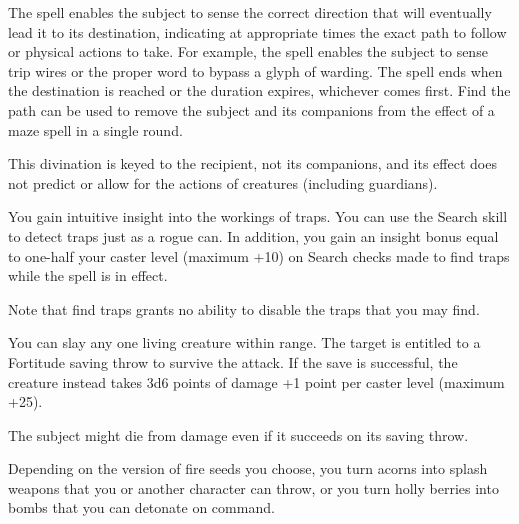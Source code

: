 \begin{multicols}{2}
\begin{small}
\smallskip\noindent The spell enables the subject to sense the correct direction that will eventually lead it to its destination, indicating at appropriate times the exact path to follow or physical actions to take. For example, the spell enables the subject to sense trip wires or the proper word to bypass a glyph of warding. The spell ends when the destination is reached or the duration expires, whichever comes first. Find the path can be used to remove the subject and its companions from the effect of a maze spell in a single round.

\smallskip\noindent This divination is keyed to the recipient, not its companions, and its effect does not predict or allow for the actions of creatures (including guardians).


\noindent You gain intuitive insight into the workings of traps. You can use the Search skill to detect traps just as a rogue can. In addition, you gain an insight bonus equal to one-half your caster level (maximum +10) on Search checks made to find traps while the spell is in effect.

\smallskip\noindent Note that find traps grants no ability to disable the traps that you may find.

\noindent You can slay any one living creature within range. The target is entitled to a Fortitude saving throw to survive the attack. If the save is successful, the creature instead takes 3d6 points of damage +1 point per caster level (maximum +25).

\smallskip\noindent The subject might die from damage even if it succeeds on its saving throw.

\noindent Depending on the version of fire seeds you choose, you turn acorns into splash weapons that you or another character can throw, or you turn holly berries into bombs that you can detonate on command.


\end{small}
\end{multicols}
